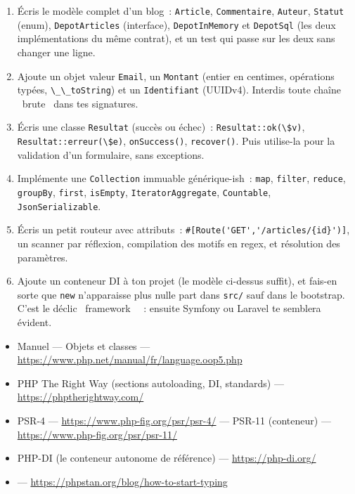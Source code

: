 \begin{exercice}
\begin{enumerate}
  \item \'Ecris le mod\`ele complet d'un blog~: \verb|Article|, \verb|Commentaire|, \verb|Auteur|,
        \verb|Statut| (enum), \verb|DepotArticles| (interface), \verb|DepotInMemory| et
        \verb|DepotSql| (les deux impl\'ementations du m\^eme contrat), et un test qui passe
        sur les deux sans changer une ligne.
  \item Ajoute un objet valeur \verb|Email|, un \verb|Montant| (entier en centimes, op\'erations
        typ\'ees, \verb|\_\_toString|) et un \verb|Identifiant| (UUIDv4). Interdis toute cha\^ine
        \og ~brute~ \fg{} dans tes signatures.
  \item \'Ecris une classe \verb|Resultat| (succ\`es ou \'echec)~: \verb|Resultat::ok(\$v)|,
        \verb|Resultat::erreur(\$e)|, \verb|onSuccess()|, \verb|recover()|. Puis utilise-la pour
        la validation d'un formulaire, sans exceptions.
  \item Impl\'emente une \verb|Collection| immuable g\'en\'erique-ish~: \verb|map|, \verb|filter|,
        \verb|reduce|, \verb|groupBy|, \verb|first|, \verb|isEmpty|, \verb|IteratorAggregate|,
        \verb|Countable|, \verb|JsonSerializable|.
  \item \'Ecris un petit routeur avec attributs~: \verb|#[Route('GET','/articles/{id}')]|,
        un scanner par r\'eflexion, compilation des motifs en regex, et r\'esolution des param\`etres.
  \item Ajoute un conteneur DI \`a ton projet (le mod\`ele ci-dessus suffit), et fais-en sorte que
        \verb|new| n'apparaisse plus nulle part dans \verb|src/| sauf dans le bootstrap.
        C'est le d\'eclic \og ~framework~ \fg{}~: ensuite Symfony ou Laravel te semblera \'evident.
\end{enumerate}
\end{exercice}

\begin{ressources}
\begin{itemize}
  \item Manuel --- Objets et classes --- \url{https://www.php.net/manual/fr/language.oop5.php}
  \item PHP The Right Way (sections autoloading, DI, standards) --- \url{https://phptherightway.com/}
  \item PSR-4 --- \url{https://www.php-fig.org/psr/psr-4/} --- PSR-11 (conteneur) --- \url{https://www.php-fig.org/psr/psr-11/}
  \item PHP-DI (le conteneur autonome de r\'ef\'erence) --- \url{https://php-di.org/}
  \item {} --- \url{https://phpstan.org/blog/how-to-start-typing}
\end{itemize}
\end{ressources}

